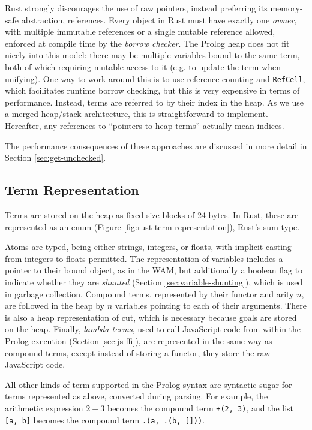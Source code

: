 Rust strongly discourages the use of raw pointers, instead preferring its memory-safe abstraction, references. Every object in Rust must have exactly one \emph{owner}, with multiple immutable references or a single mutable reference allowed, enforced at compile time by the \emph{borrow checker}. The Prolog heap does not fit nicely into this model: there may be multiple variables bound to the same term, both of which requiring mutable access to it (e.g. to update the term when unifying). One way to work around this is to use reference counting and \texttt{RefCell}, which facilitates runtime borrow checking, but this is very expensive in terms of performance. Instead, terms are referred to by their index in the heap. As we use a merged heap/stack architecture, this is straightforward to implement. Hereafter, any references to ``pointers to heap terms'' actually mean indices.

The performance consequences of these approaches are discussed in more detail in Section \ref{sec:get-unchecked}.

\subsection{Term Representation}

Terms are stored on the heap as fixed-size blocks of 24 bytes. In Rust, these are represented as an enum (Figure \ref{fig:rust-term-representation}), Rust's sum type.

Atoms are typed, being either strings, integers, or floats, with implicit casting from integers to floats permitted. The representation of variables includes a pointer to their bound object, as in the WAM, but additionally a boolean flag to indicate whether they are \emph{shunted} (Section \ref{sec:variable-shunting}), which is used in garbage collection. Compound terms, represented by their functor and arity $n$, are followed in the heap by $n$ variables pointing to each of their arguments. There is also a heap representation of cut, which is necessary because goals are stored on the heap. Finally, \emph{lambda terms}, used to call JavaScript code from within the Prolog execution (Section \ref{sec:js-ffi}), are represented in the same way as compound terms, except instead of storing a functor, they store the raw JavaScript code.

All other kinds of term supported in the Prolog syntax are syntactic sugar for terms represented as above, converted during parsing. For example, the arithmetic expression $2 + 3$ becomes the compound term \texttt{+(2, 3)}, and the list \texttt{[a, b]} becomes the compound term \texttt{.(a, .(b, []))}.

